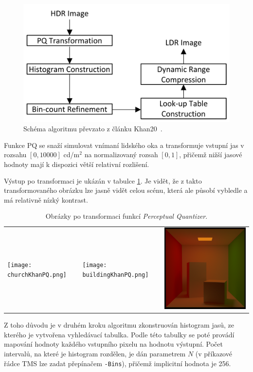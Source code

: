 \documentclass[11pt,a4paper,oneside]{article}
\begin{document}
\begin{figure}[htb]
  \begin{center}
    \includegraphics[width=0.8\linewidth]{fig/schema.png}
      \caption{Schéma algoritmu převzato z článku Khan20~\cite{Khan2020}.} 
    \label{fig:schema}
  \end{center}
\end{figure}

Funkce PQ se snaží simulovat vnímaní lidského oka a transformuje vstupní jas v
rozsahu $[0, 10000]$ cd/m$^2$ na normalizovaný rozsah $[0,1]$, přičemž nižší
jasové hodnoty mají k dispozici větší relativní rozlišení.

Výstup po transformaci je ukázán v tabulce \ref{tab:method-pq}. Je vidět, že z
takto transformovaného obrázku lze jasně vidět celou scénu, která ale působí
vybledle a má relativně nízký kontrast.

\begin{table}[htb]
    \centering
    \caption{Obrázky po transformaci funkcí \textit{Perceptual Quantizer}.}
    \label{tab:method-pq}
    \begin{tabular}{lll}
        \texttt{[image: churchKhanPQ.png]} &
        \texttt{[image: buildingKhanPQ.png]} &
        \includegraphics[width=.33\linewidth,valign=m]{cornell_boxKhanPQ.png} \\
    \end{tabular}
\end{table}

Z toho důvodu je v druhém kroku algoritmu zkonstruován histogram jasů, ze
kterého je vytvořena vyhledávací tabulka. Podle této tabulky se poté provádí
mapování hodnoty každého vstupního pixelu na hodnotu výstupní. Počet intervalů,
na které je histogram rozdělen, je dán parametrem $N$ (v příkazové řádce TMS lze
zadat přepínačem \texttt{-Bins}), přičemž implicitní hodnota je 256.
\end{document}

